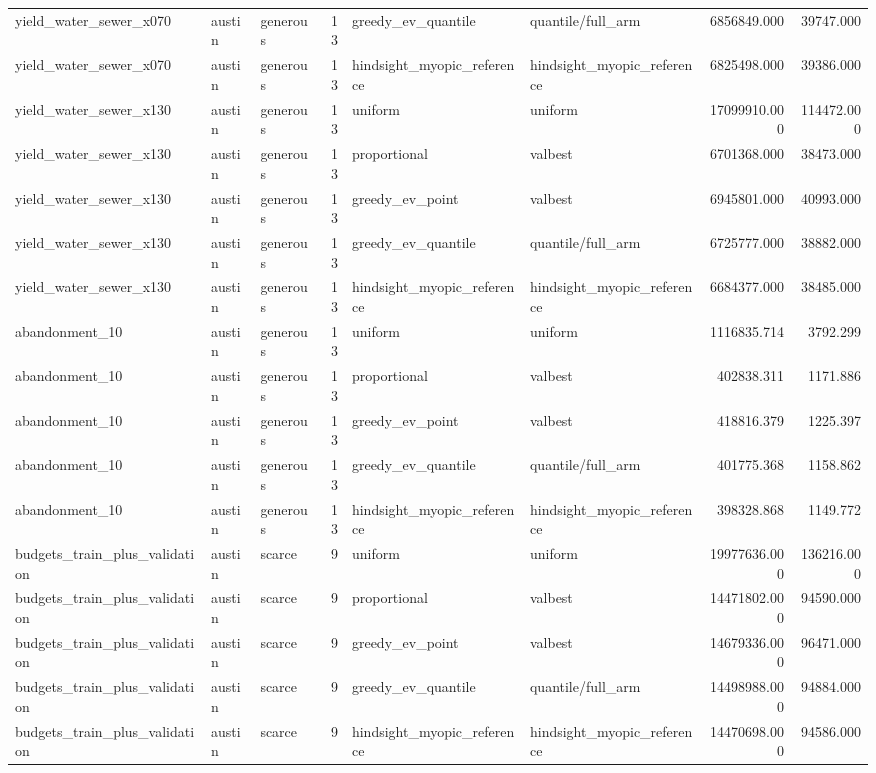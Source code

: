 \begin{tabular}{lllrllrr}
yield\_water\_sewer\_x070 & austin & generous & 13 & greedy\_ev\_quantile & quantile/full\_arm & 6856849.000 & 39747.000 \\
yield\_water\_sewer\_x070 & austin & generous & 13 & hindsight\_myopic\_reference & hindsight\_myopic\_reference & 6825498.000 & 39386.000 \\
yield\_water\_sewer\_x130 & austin & generous & 13 & uniform & uniform & 17099910.000 & 114472.000 \\
yield\_water\_sewer\_x130 & austin & generous & 13 & proportional & valbest & 6701368.000 & 38473.000 \\
yield\_water\_sewer\_x130 & austin & generous & 13 & greedy\_ev\_point & valbest & 6945801.000 & 40993.000 \\
yield\_water\_sewer\_x130 & austin & generous & 13 & greedy\_ev\_quantile & quantile/full\_arm & 6725777.000 & 38882.000 \\
yield\_water\_sewer\_x130 & austin & generous & 13 & hindsight\_myopic\_reference & hindsight\_myopic\_reference & 6684377.000 & 38485.000 \\
abandonment\_10 & austin & generous & 13 & uniform & uniform & 1116835.714 & 3792.299 \\
abandonment\_10 & austin & generous & 13 & proportional & valbest & 402838.311 & 1171.886 \\
abandonment\_10 & austin & generous & 13 & greedy\_ev\_point & valbest & 418816.379 & 1225.397 \\
abandonment\_10 & austin & generous & 13 & greedy\_ev\_quantile & quantile/full\_arm & 401775.368 & 1158.862 \\
abandonment\_10 & austin & generous & 13 & hindsight\_myopic\_reference & hindsight\_myopic\_reference & 398328.868 & 1149.772 \\
budgets\_train\_plus\_validation & austin & scarce & 9 & uniform & uniform & 19977636.000 & 136216.000 \\
budgets\_train\_plus\_validation & austin & scarce & 9 & proportional & valbest & 14471802.000 & 94590.000 \\
budgets\_train\_plus\_validation & austin & scarce & 9 & greedy\_ev\_point & valbest & 14679336.000 & 96471.000 \\
budgets\_train\_plus\_validation & austin & scarce & 9 & greedy\_ev\_quantile & quantile/full\_arm & 14498988.000 & 94884.000 \\
budgets\_train\_plus\_validation & austin & scarce & 9 & hindsight\_myopic\_reference & hindsight\_myopic\_reference & 14470698.000 & 94586.000 \\

\end{tabular}
